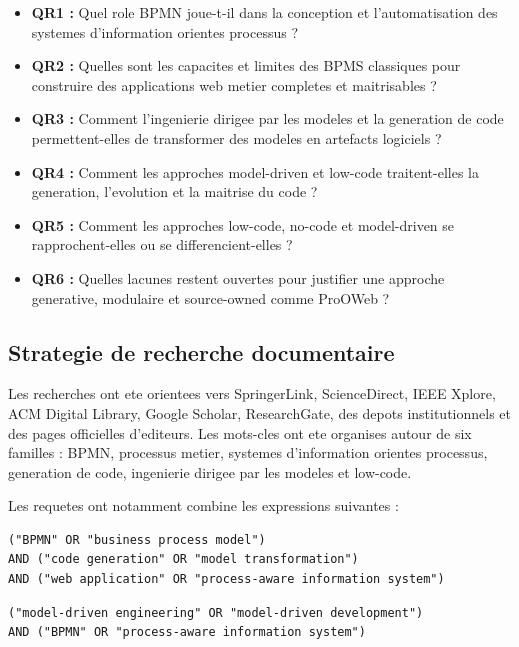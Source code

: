 \documentclass[12pt,a4paper]{article}
\begin{document}
\begin{itemize}[leftmargin=*]
  \item \textbf{QR1 :} Quel role BPMN joue-t-il dans la conception et l'automatisation des systemes d'information orientes processus ?
  \item \textbf{QR2 :} Quelles sont les capacites et limites des BPMS classiques pour construire des applications web metier completes et maitrisables ?
  \item \textbf{QR3 :} Comment l'ingenierie dirigee par les modeles et la generation de code permettent-elles de transformer des modeles en artefacts logiciels ?
  \item \textbf{QR4 :} Comment les approches model-driven et low-code traitent-elles la generation, l'evolution et la maitrise du code ?
  \item \textbf{QR5 :} Comment les approches low-code, no-code et model-driven se rapprochent-elles ou se differencient-elles ?
  \item \textbf{QR6 :} Quelles lacunes restent ouvertes pour justifier une approche generative, modulaire et source-owned comme ProOWeb ?
\end{itemize}

\subsection{Strategie de recherche documentaire}

Les recherches ont ete orientees vers SpringerLink, ScienceDirect, IEEE Xplore, ACM Digital Library, Google Scholar, ResearchGate, des depots institutionnels et des pages officielles d'editeurs. Les mots-cles ont ete organises autour de six familles : BPMN, processus metier, systemes d'information orientes processus, generation de code, ingenierie dirigee par les modeles et low-code.

Les requetes ont notamment combine les expressions suivantes :

\begin{verbatim}
("BPMN" OR "business process model")
AND ("code generation" OR "model transformation")
AND ("web application" OR "process-aware information system")
\end{verbatim}

\begin{verbatim}
("model-driven engineering" OR "model-driven development")
AND ("BPMN" OR "process-aware information system")
\end{verbatim}
\end{document}

